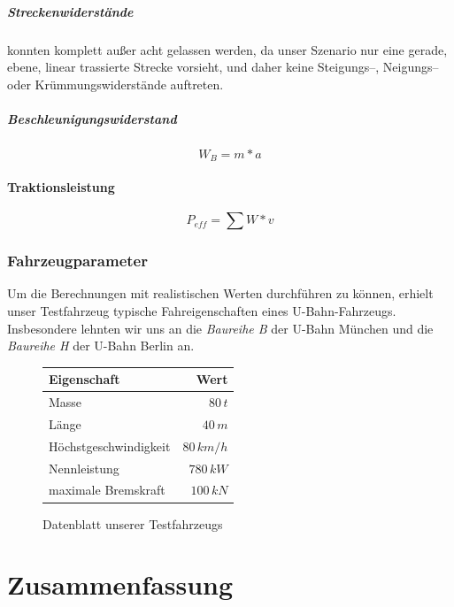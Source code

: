 \documentclass[10pt,a4paper]{article}
\begin{document}
\subparagraph{Streckenwiderstände} konnten komplett außer acht gelassen werden, da unser Szenario nur eine gerade, ebene, linear trassierte Strecke vorsieht, und daher keine Steigungs--, Neigungs-- oder Krümmungswiderstände auftreten.

\subparagraph{Beschleunigungswiderstand}
\begin{equation}
W_B = m * a
\end{equation}

\paragraph{Traktionsleistung}
\begin{equation}
P_{eff} = \sum W * v
\end{equation}

\subsubsection{Fahrzeugparameter}
Um die Berechnungen mit realistischen Werten durchführen zu können, erhielt unser Testfahrzeug typische Fahreigenschaften eines U-Bahn-Fahrzeugs. Insbesondere lehnten wir uns an die \textit{Baureihe B} der U-Bahn München und die \textit{Baureihe H} der U-Bahn Berlin an.

\begin{figure}
\begin{center}
\begin{tabular}{|lr|}
\hline \textbf{Eigenschaft} & \textbf{Wert} \\ 
\hline Masse & $ 80\, t$ \\ 
\hline Länge & $ 40\, m$ \\ 
\hline Höchstgeschwindigkeit & $ 80 \, km/h $ \\ 
\hline Nennleistung & $ 780 \, kW $ \\ 
\hline maximale Bremskraft & $ 100 \, kN $ \\ 
\hline 
\end{tabular} 
\end{center}
\caption{Datenblatt unserer Testfahrzeugs}
\label{datenblatt}
\end{figure}

\section{Zusammenfassung}
\end{document}

